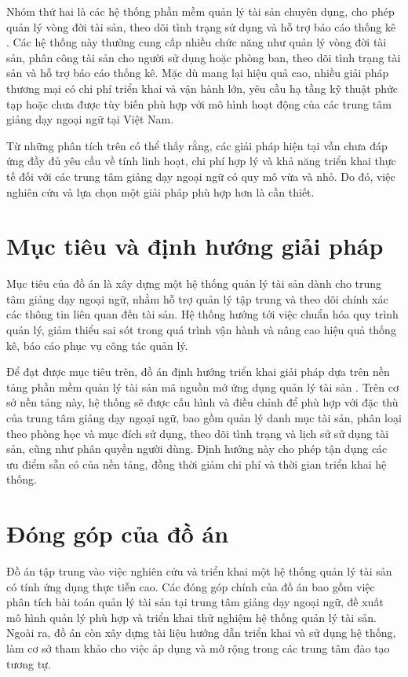 \documentclass[../DoAn.tex]{subfiles}
\begin{document}
Nhóm thứ hai là các hệ thống phần mềm quản lý tài sản chuyên dụng, cho phép quản lý vòng đời tài sản, theo dõi tình trạng sử dụng và hỗ trợ báo cáo thống kê \cite{itil2019foundation}. Các hệ thống này thường cung cấp nhiều chức năng như quản lý vòng đời tài sản, phân công tài sản cho người sử dụng hoặc phòng ban, theo dõi tình trạng tài sản và hỗ trợ báo cáo thống kê. Mặc dù mang lại hiệu quả cao, nhiều giải pháp thương mại có chi phí triển khai và vận hành lớn, yêu cầu hạ tầng kỹ thuật phức tạp hoặc chưa được tùy biến phù hợp với mô hình hoạt động của các trung tâm giảng dạy ngoại ngữ tại Việt Nam.

Từ những phân tích trên có thể thấy rằng, các giải pháp hiện tại vẫn chưa đáp ứng đầy đủ yêu cầu về tính linh hoạt, chi phí hợp lý và khả năng triển khai thực tế đối với các trung tâm giảng dạy ngoại ngữ có quy mô vừa và nhỏ. Do đó, việc nghiên cứu và lựa chọn một giải pháp phù hợp hơn là cần thiết.

\section{Mục tiêu và định hướng giải pháp}

Mục tiêu của đồ án là xây dựng một hệ thống quản lý tài sản dành cho trung tâm giảng dạy ngoại ngữ, nhằm hỗ trợ quản lý tập trung và theo dõi chính xác các thông tin liên quan đến tài sản. Hệ thống hướng tới việc chuẩn hóa quy trình quản lý, giảm thiểu sai sót trong quá trình vận hành và nâng cao hiệu quả thống kê, báo cáo phục vụ công tác quản lý.

Để đạt được mục tiêu trên, đồ án định hướng triển khai giải pháp dựa trên nền tảng phần mềm quản lý tài sản mã nguồn mở ứng dụng quản lý tài sản \cite{snipeitdocs, hutchins2019itasset}. Trên cơ sở nền tảng này, hệ thống sẽ được cấu hình và điều chỉnh để phù hợp với đặc thù của trung tâm giảng dạy ngoại ngữ, bao gồm quản lý danh mục tài sản, phân loại theo phòng học và mục đích sử dụng, theo dõi tình trạng và lịch sử sử dụng tài sản, cũng như phân quyền người dùng. Định hướng này cho phép tận dụng các ưu điểm sẵn có của nền tảng, đồng thời giảm chi phí và thời gian triển khai hệ thống.

\section{Đóng góp của đồ án}

Đồ án tập trung vào việc nghiên cứu và triển khai một hệ thống quản lý tài sản có tính ứng dụng thực tiễn cao. Các đóng góp chính của đồ án bao gồm việc phân tích bài toán quản lý tài sản tại trung tâm giảng dạy ngoại ngữ, đề xuất mô hình quản lý phù hợp và triển khai thử nghiệm hệ thống quản lý tài sản. Ngoài ra, đồ án còn xây dựng tài liệu hướng dẫn triển khai và sử dụng hệ thống, làm cơ sở tham khảo cho việc áp dụng và mở rộng trong các trung tâm đào tạo tương tự.
\end{document}
